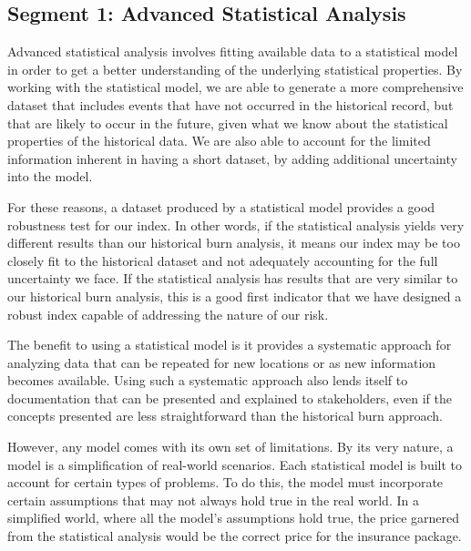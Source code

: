 \documentclass[letterpaper,10pt,english]{sphinxmanual}
\begin{document}
\subsection{Segment 1: Advanced Statistical Analysis}
\label{wiiet/wiiet_initialtomarketpricing_Web:segment-1-advanced-statistical-analysis}
Advanced statistical analysis involves fitting available data to a statistical model in order to get a better understanding of the underlying statistical properties. By working with the statistical model, we are able to generate a more comprehensive dataset that includes events that have not occurred in the historical record, but that are likely to occur in the future, given what we know about the statistical properties of the historical data. We are also able to account for the limited information inherent in having a short dataset, by adding additional uncertainty into the model.

For these reasons, a dataset produced by a statistical model provides a good robustness test for our index. In other words, if the statistical analysis yields very different results than our historical burn analysis, it means our index may be too closely fit to the historical dataset and not adequately accounting for the full uncertainty we face. If the statistical analysis has results that are very similar to our historical burn analysis, this is a good first indicator that we have designed a robust index capable of addressing the nature of our risk.

The benefit to using a statistical model is it provides a systematic approach for analyzing data that can be repeated for new locations or as new information becomes available. Using such a systematic approach also lends itself to documentation that can be presented and explained to stakeholders, even if the concepts presented are less straightforward than the historical burn approach.

However, any model comes with its own set of limitations. By its very nature, a model is a simplification of real-world scenarios. Each statistical model is built to account for certain types of problems. To do this, the model must incorporate certain assumptions that may not always hold true in the real world. In a simplified world, where all the model's assumptions hold true, the price garnered from the statistical analysis would be the correct price for the insurance package.
\end{document}

